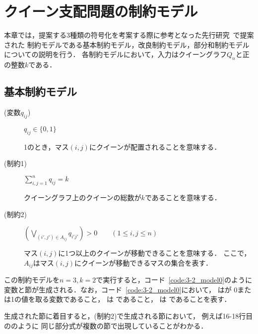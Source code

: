 \chapter{クイーン支配問題の制約モデル}\label{chap:constraint}
本章では，提案する3種類の符号化を考案する際に参考となった先行研究~\cite{yamamoto21}で提案された
制約モデルである基本制約モデル，改良制約モデル，部分和制約モデルについての説明を行う．
各制約モデルにおいて，入力はクイーングラフ$Q_{n}$と正の整数$k$である．

\section{基本制約モデル}
\begin{description}
 \item[(変数$q_{ij}$)] $q_{ij} \in \{0,1\}$ \par
1のとき，マス$(i,j)$にクイーンが配置されることを意味する．
 \item[(制約1)] $\sum\limits_{i,j=1}^{n} q_{ij} = k$ \par
クイーングラフ上のクイーンの総数が$k$であることを意味する．
 \item[(制約2)] $(\bigvee\limits_{(i',j')\in A_{ij}} 
q_{i'j'}) >0 \qquad (1 \leq i,j \leq n)$ \par
マス$(i,j)$に1つ以上のクイーンが移動できることを意味する．
ここで，$A_{ij}$はマス$(i,j)$にクイーンが移動できるマスの集合を表す．
\end{description}

この制約モデルを$n=3,k=2$で実行すると，コード~\ref{code:3-2_model0}のように
変数と節が生成される．なお，コード~\ref{code:3-2_model0}において，
    はが
0または1の値を取る変数であること，  
は  
であること，  
は  
であることを表す．

生成された節に着目すると，(制約2)で生成される節において，
例えば16-18行目ののように
同じ部分式が複数の節で出現していることがわかる．


\newpage
